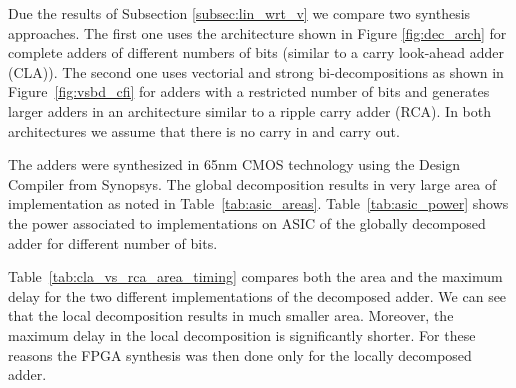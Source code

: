 \documentclass[a4paper]{article}
\begin{document}
%
%

Due the results of Subsection \ref{subsec:lin_wrt_v} we compare two synthesis approaches. The first one uses the 
architecture shown in Figure \ref{fig:dec_arch} for complete adders of different numbers of bits (similar to a carry look-ahead adder (CLA)). The second one uses vectorial and strong bi-decompositions as shown in Figure~\ref{fig:vsbd_cfi} for adders with a restricted number of bits and generates larger adders in an architecture similar to a ripple carry adder (RCA). In both architectures we assume that there is no carry in and carry out.


The adders were synthesized in 65nm CMOS technology using the Design Compiler from Synopsys. 
The global decomposition results in very large area of implementation as noted in Table~\ref{tab:asic_areas}.
Table~\ref{tab:asic_power} shows the power associated to implementations on ASIC of the globally decomposed adder for different number of bits. 



Table~\ref{tab:cla_vs_rca_area_timing} compares both the area and the maximum delay for the two different implementations of the decomposed adder.
We can see that the local decomposition results in much smaller area.
Moreover, the maximum delay in the local decomposition is significantly shorter.
For these reasons the FPGA synthesis was then done only for the locally decomposed adder.
\end{document}
